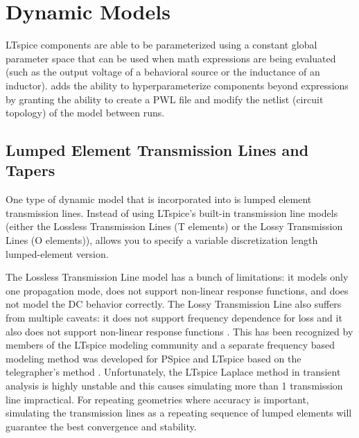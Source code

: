 




\section{Dynamic Models} \label{dyn_models}

LTspice components are able to be parameterized using a constant global parameter space that can be used when
math expressions are being evaluated (such as the output voltage of a behavioral source or the inductance 
of an inductor).  adds the ability to hyperparameterize components beyond expressions by granting the
ability to create a PWL file and modify the netlist (circuit topology) of the model between runs.

\subsection{Lumped Element Transmission Lines and Tapers}\label{tapers_section}

One type of dynamic model that is incorporated into  is lumped 
element transmission lines. Instead of using LTspice's built-in transmission
line models (either the Lossless Transmission Lines (T elements) or the 
Lossy Transmission Lines (O elements)),  allows you to specify a
variable discretization length lumped-element version. 

The Lossless Transmission Line model has a bunch of limitations: it models only one propagation mode,
 does not support non-linear response functions, and does not 
model the DC behavior correctly. The Lossy Transmission Line also suffers from multiple caveats:
it does not support frequency dependence for loss and it also does not support non-linear response 
functions \cite{ltwiki_tline_issues}. This has been recognized by members of the 
LTspice modeling community and a separate frequency based modeling method was developed
for PSpice and LTspice based on the telegrapher's method \cite{camron_model_tline}. Unfortunately, the LTspice
Laplace method in transient analysis is highly unstable and this causes simulating 
more than 1 transmission line impractical. For repeating geometries where accuracy is important, simulating the
transmission lines as a repeating sequence of lumped elements will guarantee the best
convergence and stability.

